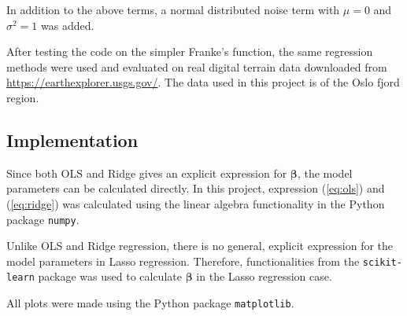 In addition to the above terms, a normal distributed noise term with $\mu = 0$ and $\sigma^2 = 1$ was added.

After testing the code on the simpler Franke's function, the same regression methods were used and evaluated on real digital terrain data downloaded from \url{https://earthexplorer.usgs.gov/}. The data used in this project is of the Oslo fjord region.

\subsection{Implementation}
Since both OLS and Ridge gives an explicit expression for $\boldsymbol{\beta}$, the model parameters can be calculated directly. In this project, expression (\ref{eq:ols}) and (\ref{eq:ridge}) was calculated using the linear algebra functionality in the Python package \texttt{numpy}.

Unlike OLS and Ridge regression, there is no general, explicit expression for the model parameters in Lasso regression. Therefore, functionalities from the \texttt{scikit-learn} package was used to calculate $\boldsymbol{\beta}$  in the Lasso regression case.



All plots were made using the Python package \texttt{matplotlib}.
